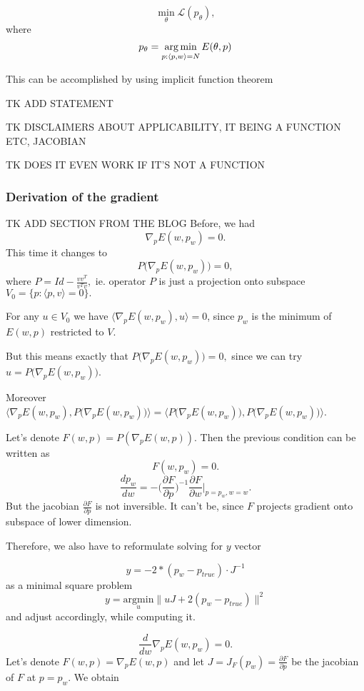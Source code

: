 \documentclass[a4paper,10pt]{report}
\begin{document}
\begin{equation}
 \min_\theta \mathcal{L}(p_\theta),
\end{equation}
where
\begin{equation}
 p_\theta = \operatorname*{arg\,min}_{p: \langle p, w \rangle=N} E(\theta, p)
\end{equation}

This can be accomplished by using implicit function theorem

TK ADD STATEMENT

TK DISCLAIMERS ABOUT APPLICABILITY, IT BEING A FUNCTION ETC, JACOBIAN

TK DOES IT EVEN WORK IF IT'S NOT A FUNCTION
\subsubsection{Derivation of the gradient}
TK ADD SECTION FROM THE BLOG
Before, we had
$$\nabla_p E(w,p_w) = 0.$$
This time it changes to
$$P\big( \nabla_p E(w,p_w)\big)=0,$$
where $P = Id - \frac{vv^T}{v^Tv},$ ie. operator $P$ is just a projection onto subspace $V_0 = \{p: \langle p,v \rangle = 0\}.$


For any $u\in V_0$ we have $\langle \nabla_p E(w,p_w), u \rangle = 0$, since $p_w$ is the minimum of $E(w,p)$ restricted to $V$.


But this means exactly that $P\big( \nabla_p E(w,p_w)\big)=0,$ since we can try $u = P\big( \nabla_p E(w,p_w)\big)$.

Moreover $\langle \nabla_p E(w,p_w), P\big( \nabla_p E(w,p_w)\big) \rangle = \langle P\big( \nabla_p E(w,p_w)\big) , P\big( \nabla_p E(w,p_w)\big) \rangle$.

Let's denote $F(w,p) =P (\nabla_pE(w,p)).$ Then the previous condition can be written as
$$F(w,p_w) = 0.$$
$$\frac{d p_w}{dw} = - \bigg(\frac{\partial F}{\partial p}\bigg)^{-1}  \frac{\partial F}{\partial w}\bigg|_{p=p_w, w=w}.$$
But the jacobian $\frac{\partial F}{\partial p}$ is not inversible. It can't be, since $F$ projects gradient onto subspace of lower dimension.

Therefore, we also have to reformulate solving for $y$ vector

$$y =- 2*(p_w-p_{true}) \cdot J^{-1}$$
as a minimal square problem
$$y = \underset{u}{\mathrm{argmin }}\|uJ + 2(p_w-p_{true})\|^2$$ and adjust accordingly, while computing it.


$$ \frac{d}{dw} \nabla_p E(w,p_w) = 0.$$
 Let's denote $F(w,p) = \nabla_p E(w,p)$ and let $J = J_{F}(p_w)=\frac{\partial F}{\partial p}$ be the jacobian of $F$ at $p = p_w$.
We obtain
\end{document}
